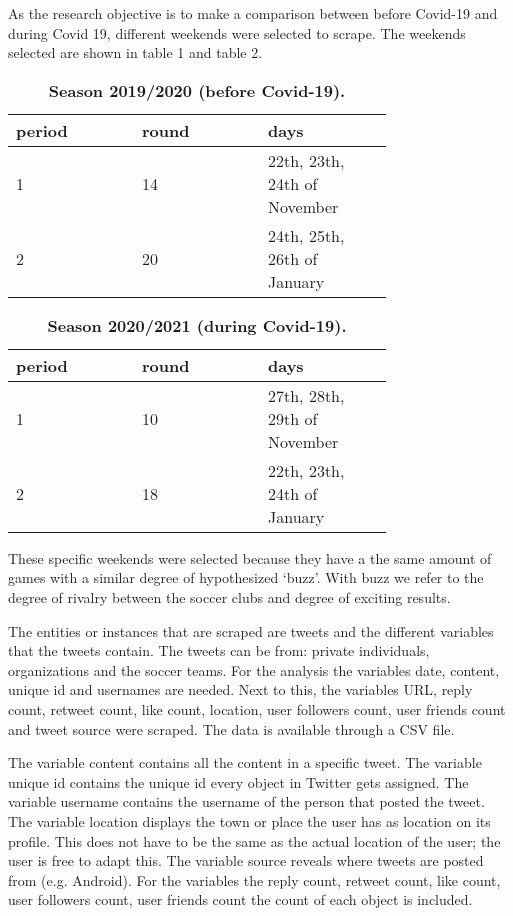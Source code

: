 \documentclass[12pt]{article}
\begin{document}
As the research objective is to make a comparison between before Covid-19 and during Covid 19, different weekends were selected to scrape. The weekends selected are shown in table 1 and table 2.  

\begin{table*}[ht]
\caption{\textbf{Season 2019/2020 (before Covid-19).}}
\centering
\begin{tabular}{p{0.25\linewidth}p{0.25\linewidth}p{0.25\linewidth}}
\hline
period & round  & days\\
\hline
1 & 14  & 22th, 23th, 24th of November\\
2 & 20 & 24th, 25th, 26th of January\\
\hline
\end{tabular}
\end{table*}

\begin{table*}[ht]
\caption{\textbf{Season 2020/2021 (during Covid-19).}}
\centering
\begin{tabular}{p{0.25\linewidth}p{0.25\linewidth}p{0.25\linewidth}}
\hline
period & round  & days\\
\hline
1 & 10  & 27th, 28th, 29th of November\\
2 & 18 & 22th, 23th, 24th of January\\
\hline
\end{tabular}
\end{table*}

These specific weekends were selected because they have a the same amount of games with a similar degree of hypothesized ‘buzz’. With buzz we refer to the degree of rivalry between the soccer clubs and degree of exciting results. 

The entities or instances that are scraped are tweets and the different variables that the tweets contain. The tweets can be from: private individuals, organizations and the soccer teams. For the analysis the variables date, content, unique id and usernames are needed. Next to this, the variables URL, reply count, retweet count, like count, location, user followers count, user friends count and tweet source were scraped. The data is available through a CSV file. 

The variable content contains all the content in a specific tweet. The variable unique id contains the unique id every object in Twitter gets assigned. The variable username contains the username of the person that posted the tweet. The variable location displays the town or place the user has as location on its profile. This does not have to be the same as the actual location of the user; the user is free to adapt this. The variable source reveals where tweets are posted from (e.g. Android). For the variables the reply count, retweet count, like count, user followers count, user friends count the count of each object is included. 
\end{document}
